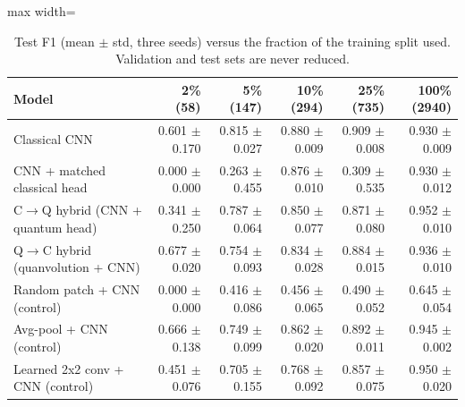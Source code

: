 \begin{table}[htbp]
\centering
\scriptsize
\caption{Test F1 (mean $\pm$ std, three seeds) versus the fraction of the training split used. Validation and test sets are never reduced.}
\label{tab:study_lowdata}
\begin{adjustbox}{max width=\linewidth}
\begin{tabular}{lrrrrr}
\toprule
Model & 2\% (58) & 5\% (147) & 10\% (294) & 25\% (735) & 100\% (2940) \\
\midrule
Classical CNN & 0.601 $\pm$ 0.170 & 0.815 $\pm$ 0.027 & 0.880 $\pm$ 0.009 & 0.909 $\pm$ 0.008 & 0.930 $\pm$ 0.009 \\
CNN + matched classical head & 0.000 $\pm$ 0.000 & 0.263 $\pm$ 0.455 & 0.876 $\pm$ 0.010 & 0.309 $\pm$ 0.535 & 0.930 $\pm$ 0.012 \\
C$\rightarrow$Q hybrid (CNN + quantum head) & 0.341 $\pm$ 0.250 & 0.787 $\pm$ 0.064 & 0.850 $\pm$ 0.077 & 0.871 $\pm$ 0.080 & 0.952 $\pm$ 0.010 \\
Q$\rightarrow$C hybrid (quanvolution + CNN) & 0.677 $\pm$ 0.020 & 0.754 $\pm$ 0.093 & 0.834 $\pm$ 0.028 & 0.884 $\pm$ 0.015 & 0.936 $\pm$ 0.010 \\
Random patch + CNN (control) & 0.000 $\pm$ 0.000 & 0.416 $\pm$ 0.086 & 0.456 $\pm$ 0.065 & 0.490 $\pm$ 0.052 & 0.645 $\pm$ 0.054 \\
Avg-pool + CNN (control) & 0.666 $\pm$ 0.138 & 0.749 $\pm$ 0.099 & 0.862 $\pm$ 0.020 & 0.892 $\pm$ 0.011 & 0.945 $\pm$ 0.002 \\
Learned 2x2 conv + CNN (control) & 0.451 $\pm$ 0.076 & 0.705 $\pm$ 0.155 & 0.768 $\pm$ 0.092 & 0.857 $\pm$ 0.075 & 0.950 $\pm$ 0.020 \\
\bottomrule
\end{tabular}
\end{adjustbox}
\end{table}
